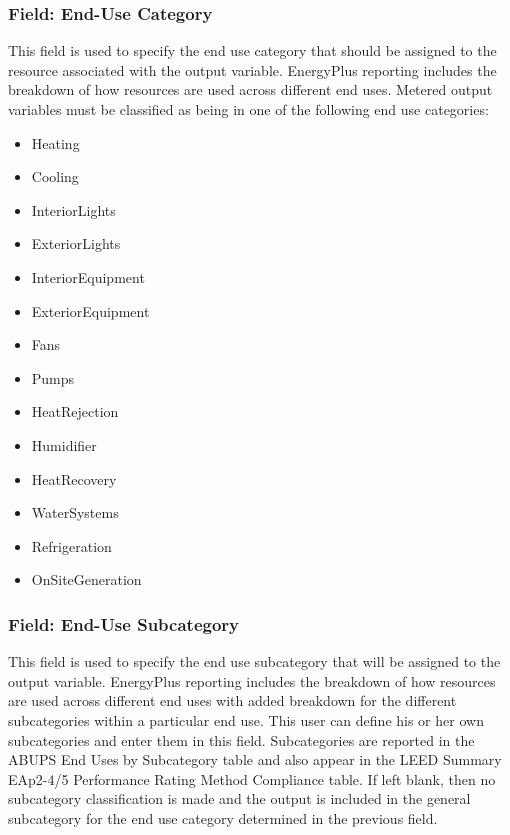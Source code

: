 \subsubsection{Field: End-Use Category}\label{field-end-use-category}

This field is used to specify the end use category that should be assigned to the resource associated with the output variable. EnergyPlus reporting includes the breakdown of how resources are used across different end uses. Metered output variables must be classified as being in one of the following end use categories:

\begin{itemize}
\item
  Heating
\item
  Cooling
\item
  InteriorLights
\item
  ExteriorLights
\item
  InteriorEquipment
\item
  ExteriorEquipment
\item
  Fans
\item
  Pumps
\item
  HeatRejection
\item
  Humidifier
\item
  HeatRecovery
\item
  WaterSystems
\item
  Refrigeration
\item
  OnSiteGeneration
\end{itemize}

\subsubsection{Field: End-Use Subcategory}\label{field-end-use-subcategory}

This field is used to specify the end use subcategory that will be assigned to the output variable. EnergyPlus reporting includes the breakdown of how resources are used across different end uses with added breakdown for the different subcategories within a particular end use. This user can define his or her own subcategories and enter them in this field. Subcategories are reported in the ABUPS End Uses by Subcategory table and also appear in the LEED Summary EAp2-4/5 Performance Rating Method Compliance table. If left blank, then no subcategory classification is made and the output is included in the general subcategory for the end use category determined in the previous field.

